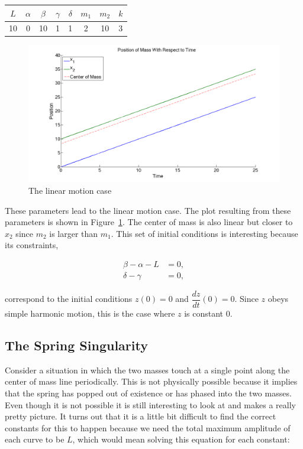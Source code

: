 \documentclass[11pt, oneside]{article}   	%
\begin{document}
\begin{center}

\begin{tabular}{| c | c | c | c | c | c | c | c |}

\hline

$L$ & $\alpha$ & $\beta$ & $\gamma$ & $\delta$ & $m_1$ & $m_2$ & $k$ \\

\hline

 10 & 0 & 10 & 1 & 1 & 2 & 10 & 3\\

\hline

\end{tabular}

\end{center}

\begin{figure}[h!]
\centering \includegraphics[scale=0.3]{sanity2}
\caption{\label{sanity2} The linear motion case}
\end{figure}

These parameters lead to the linear motion case.
The plot resulting from these parameters is shown in Figure~\ref{sanity2}.
The center of mass is also linear but closer to $x_2$ since $m_2$ is larger than $m_1$.
This set of initial conditions is interesting because its constraints,

\begin{align*}
\beta - \alpha - L &= 0,\\
\delta - \gamma &= 0,
\end{align*}

correspond to the initial conditions $z(0)=0$ and $\dfrac{dz}{dt}(0) = 0$.
Since $z$ obeys simple harmonic motion, this is the case where $z$ is constant 0.

\subsection{The Spring Singularity}
Consider a situation in which the two masses touch at a single point along the center of mass line periodically.
This is not physically possible because it implies that the spring has popped out of existence or has phased into the two masses.
Even though it is not possible it is still interesting to look at and makes a really pretty picture.
It turns out that it is a little bit difficult to find the correct constants for this to happen because we need the total maximum amplitude of each curve to be $L$, which would mean solving this equation for each constant:
\end{document}
